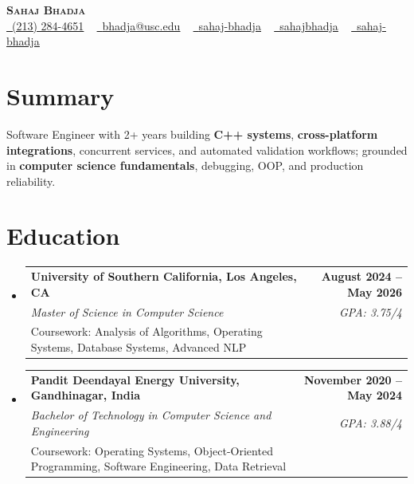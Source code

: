 \documentclass[letterpaper,10pt]{article}
\makeatletter
\newcommand{\sectionGap}{\vspace{-8pt}}
\newcommand{\resumeEduSubheading}[5]{\vspace{-1pt}\item\begin{tabular*}{1.0\textwidth}[t]{l@{\extracolsep{\fill}}r}\textbf{#1} & \textbf{\small #2} \\\textit{\small #3} & \textit{\small #4} \\\small #5 & \\\end{tabular*}\vspace{-4pt}}
\newcommand{\resumeSubHeadingListStart}{\begin{itemize}[leftmargin=0.0in, label={}]}
\newcommand{\resumeSubHeadingListEnd}{\end{itemize}}
\makeatother
\begin{document}
\begin{center}
{\Huge \scshape \textbf{Sahaj Bhadja}} \\ \vspace{1pt}
\small \href{tel:2132844651}{\faPhone\ \underline{(213) 284-4651}} ~ \href{mailto:bhadja@usc.edu}{\raisebox{-0.2\height}\faEnvelope\ \underline{bhadja@usc.edu}} ~
\href{https://www.linkedin.com/in/sahaj-bhadja/}{\raisebox{-0.2\height}\faLinkedin\ \underline{sahaj-bhadja}} ~ \href{https://github.com/SAHAJ-BHADJA}{\raisebox{-0.2\height}\faGithub\ \underline{sahajbhadja}} ~
\href{https://sahaj-bhadja.vercel.app/}{\raisebox{-0.2\height}\faGlobe\ \underline{sahaj-bhadja}}
\end{center}
\vspace{-16pt}
\section{Summary}
\begin{itemize}[leftmargin=0.15in, label={}]
\small{\item{Software Engineer with 2+ years building \textbf{C++ systems}, \textbf{cross-platform integrations}, concurrent services, and automated validation workflows; grounded in \textbf{computer science fundamentals}, debugging, OOP, and production reliability.}}
\end{itemize}
\sectionGap
\section{Education}
\resumeSubHeadingListStart
\resumeEduSubheading{University of Southern California, Los Angeles, CA}{August 2024 -- May 2026}{Master of Science in Computer Science}{GPA: 3.75/4}{Coursework: Analysis of Algorithms, Operating Systems, Database Systems, Advanced NLP}
\resumeEduSubheading{Pandit Deendayal Energy University, Gandhinagar, India}{November 2020 -- May 2024}{Bachelor of Technology in Computer Science and Engineering}{GPA: 3.88/4}{Coursework: Operating Systems, Object-Oriented Programming, Software Engineering, Data Retrieval}
\resumeSubHeadingListEnd
\sectionGap
\end{document}
